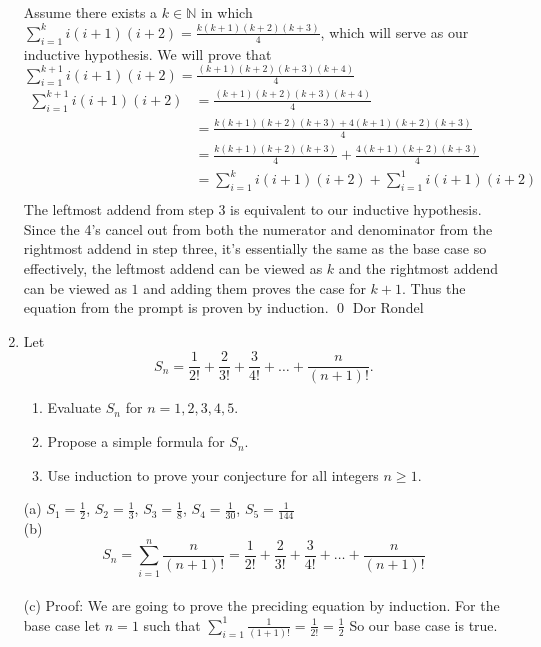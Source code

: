 \documentclass{article}
\newcommand\tabsmall[1][0.2cm]{\hspace*{#1}}
\begin{document}
\begin{enumerate}
Assume there exists a $k \in \mathbb{N}$ in which $ \sum_{i=1}^k i(i+1)(i+2) = \frac{k(k+1)(k+2)(k+3)}{4}$, which will serve as our inductive hypothesis. We will prove that $ \sum_{i=1}^{k+1} i(i+1)(i+2) = \frac{(k+1)(k+2)(k+3)(k+4)}{4}$ \\
\begin{align*}
     \sum_{i=1}^{k+1} i(i+1)(i+2) &= \frac{(k+1)(k+2)(k+3)(k+4)}{4} \\
                                  &= \frac{k(k+1)(k+2)(k+3)+4(k+1)(k+2)(k+3)}{4} \\
                                  &= \frac{k(k+1)(k+2)(k+3)}{4}+\frac{4(k+1)(k+2)(k+3)}{4} \\
                                  &= \sum_{i=1}^k i(i+1)(i+2) + \sum_{i=1}^1 i(i+1)(i+2) \\  
\end{align*}
The leftmost addend from step 3 is equivalent to our inductive hypothesis. Since the 4's cancel out from both the numerator and denominator from the rightmost addend in step three, it's essentially the same as the base case so effectively, the leftmost addend can be viewed as $k$ and the rightmost addend can be viewed as $1$ and adding them proves the case for $k+1$. Thus the equation from the prompt is proven by induction. \qed
  \newpage
Dor Rondel \\
  \item Let $$S_n = \frac{1}{2!} + \frac{2}{3!} + \frac{3}{4!} + \dots + \frac{n}{(n+1)!}.$$
    \begin{enumerate}
        \item Evaluate $S_n$ for $n = 1, 2, 3, 4, 5$.
        \item Propose a simple formula for $S_n$.
        \item Use induction to prove your conjecture for all integers $n \geq 1$. \\
    \end{enumerate} 
    \newline
    (a) $S_1=\frac{1}{2}$, \tabsmall $S_2=\frac{1}{3}$, \tabsmall $S_3=\frac{1}{8}$, \tabsmall $S_4=\frac{1}{30}$, \tabsmall $S_5=\frac{1}{144}$ \\
    \newline
    (b) $$S_n = \sum_{i=1}^n \frac{n}{(n+1)!} = \frac{1}{2!} + \frac{2}{3!} + \frac{3}{4!} + \dots + \frac{n}{(n+1)!}$$ \\
    \newline
    (c) Proof: We are going to prove the preciding equation by induction. For the base case let $n=1$ such that $\sum_{i=1}^1 \frac{1}{(1+1)!} = \frac{1}{2!} = \frac{1}{2}$ So our base case is true. \\

\end{enumerate}
\end{document}
